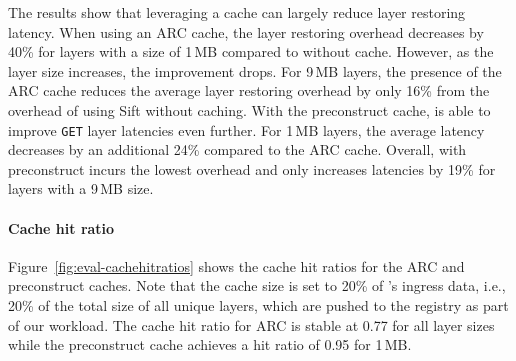 %
The results show that
leveraging a cache can largely reduce layer restoring latency.
%
When using an ARC cache, the layer restoring overhead decreases by 40\% for layers with
a size of 1\,MB compared to \sysname without cache.
%
However, as the layer size increases,  the improvement drops.
%
For 9\,MB layers, the presence of the ARC cache reduces the average layer restoring overhead by only 16\%
from the overhead of using Sift without caching.
%
%
With the preconstruct cache, \sysname is able to improve \texttt{GET} layer latencies even further.
%
For 1\,MB layers, the average latency decreases by an additional 24\% compared to the ARC cache.
%
Overall, \sysname with preconstruct incurs the lowest overhead and only increases latencies by
19\% for layers with a 9\,MB size. 

\paragraph{Cache hit ratio}
%
Figure~\ref{fig:eval-cachehitratios} shows the cache hit ratios for the ARC and
preconstruct caches.
%
Note that the cache size is set to 20\% of \dal{}'s ingress data, i.e., 20\% of the total size of
all unique layers, which are pushed to the registry as part of our workload.
%
%
%
The cache hit ratio for ARC is stable at 0.77 for all layer sizes while
the preconstruct cache achieves a hit ratio of 0.95 for 1\,MB.

